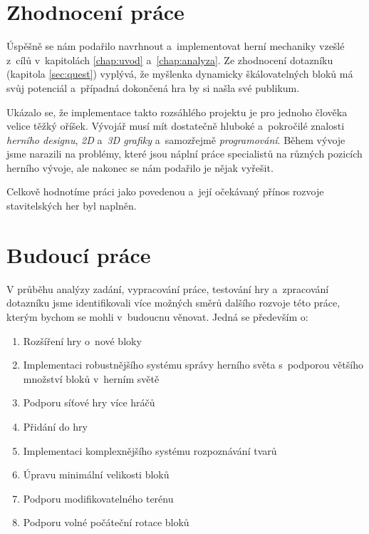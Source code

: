 \section{Zhodnocení práce}

Úspěšně se nám podařilo navrhnout a~implementovat herní mechaniky vzešlé z~cílů v~kapitolách \ref{chap:uvod} a~\ref{chap:analyza}. Ze zhodnocení dotazníku (kapitola \ref{sec:quest}) vyplývá, že myšlenka dynamicky škálovatelných bloků má svůj potenciál a~případná dokončená hra by si našla své publikum.

Ukázalo se, že implementace takto rozsáhlého projektu je pro jednoho člověka velice těžký oříšek. Vývojář musí mít dostatečně hluboké a~pokročilé znalosti \textit{herního designu}, \textit{2D} a~\textit{3D grafiky} a~samozřejmě \textit{programování}. Během vývoje jsme narazili na problémy, které jsou náplní práce specialistů na různých pozicích herního vývoje, ale nakonec se nám podařilo je nějak vyřešit.

Celkově hodnotíme práci jako povedenou a~její očekávaný přínos rozvoje stavitelských her byl naplněn.





\section{Budoucí práce}

V průběhu analýzy zadání, vypracování práce, testování hry a~zpracování dotazníku jsme identifikovali více možných směrů dalšího rozvoje této práce, kterým bychom se mohli v~budoucnu věnovat. Jedná se především o:

\begin{enumerate}
	\item Rozšíření hry o~nové bloky
	\item Implementaci robustnějšího systému správy herního světa s~podporou většího množství bloků v~herním světě
	\item Podporu síťové hry více hráčů
	\item Přidání \NPC{} do hry
	\item Implementaci komplexnějšího systému rozpoznávání tvarů
	\item Úpravu minimální velikosti bloků
	\item Podporu modifikovatelného terénu
	\item Podporu volné počáteční rotace bloků
\end{enumerate}

